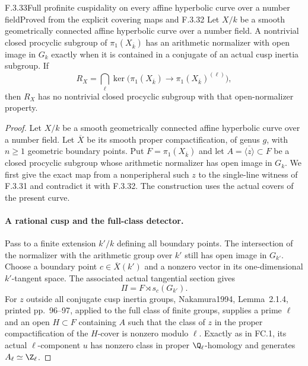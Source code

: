 \begin{result}{F.3.33}{Full profinite cuspidality on every affine hyperbolic curve over a number field}{Proved from the explicit covering maps and F.3.32}
Let $X/k$ be a smooth geometrically connected affine hyperbolic curve over a number field. A nontrivial closed procyclic subgroup of $\pi_1(X_{\overline k})$ has an arithmetic normalizer with open image in $G_k$ exactly when it is contained in a conjugate of an actual cusp inertia subgroup. If
\[
 R_X=\bigcap_\ell\ker\bigl(\pi_1(X_{\overline k})
                 \longrightarrow\pi_1(X_{\overline k})^{(\ell)}\bigr),
\]
then $R_X$ has no nontrivial closed procyclic subgroup with that open-normalizer property.
\end{result}
\begin{proof}

Let $X/k$ be a smooth geometrically connected affine hyperbolic curve
over a number field. Let $\overline X$ be its smooth proper
compactification, of genus $g$, with $n\geq1$ geometric boundary
points. Put $F=\pi_1(X_{\overline k})$ and let
$A=\overline{\langle z\rangle}\subset F$ be a closed procyclic
subgroup whose arithmetic normalizer has open image in $G_k$.
We first give the exact map from a nonperipheral such $z$ to the
single-line witness of F.3.31 and contradict it with F.3.32.
The construction uses the actual covers of the present curve.

\paragraph{A rational cusp and the full-class detector.}
Pass to a finite extension $k'/k$ defining all boundary points.
The intersection of the normalizer with the arithmetic group
over $k'$ still has open image in $G_{k'}$. Choose a boundary
point $c\in\overline X(k')$ and a nonzero vector in its
one-dimensional $k'$-tangent space. The associated actual
tangential section gives
\[
       \Pi=F\rtimes s_c(G_{k'}).
\]
For $z$ outside all conjugate cusp inertia groups,
Nakamura1994, Lemma~2.1.4, printed pp.~96--97\cite{AuditNakamura1994}, applied to
the full class of finite groups, supplies a prime $\ell$
and an open $H\subset F$ containing $A$ such that the
class of $z$ in the proper compactification of the
$H$-cover is nonzero modulo $\ell$. Exactly as in FC.1,
its actual $\ell$-component $u$ has nonzero class in
proper $\Q_\ell$-homology and generates
$A_\ell\simeq\Z_\ell$.


\end{proof}
